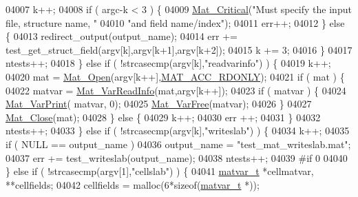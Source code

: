 \begin{DoxyCode}
{{{{{{{{{{{{{{{{{{{{{{{{{{{{{{{{{{{{{{{{{{{{{{{{{{{{{{{{{{{{{{{{{{{{04007             k++;
04008             \textcolor{keywordflow}{if} ( argc-k < 3 ) \{
04009                 \hyperlink{group__mat__util_gaf51f2bfbb5580f575e4dd79757e2b80c}{Mat\_Critical}(\textcolor{stringliteral}{"Must specify the input file, structure name, "}
04010                              \textcolor{stringliteral}{"and field name/index"});
04011                 err++;
04012             \} \textcolor{keywordflow}{else} \{
04013                 redirect\_output(output\_name);
04014                 err += test\_get\_struct\_field(argv[k],argv[k+1],argv[k+2]);
04015                 k += 3;
04016             \}
04017             ntests++;
04018         \} \textcolor{keywordflow}{else} \textcolor{keywordflow}{if} ( !strcasecmp(argv[k],\textcolor{stringliteral}{"readvarinfo"}) ) \{
04019             k++;
04020             mat = \hyperlink{group___m_a_t_gafbfedb5636a99f0ef867520c47f77d18}{Mat\_Open}(argv[k++],\hyperlink{group___m_a_t_ggaa9dcbc70f538af79bd557593ff6b5cdba8dd1457651b27ba9bea6cfba158c037c}{MAT\_ACC\_RDONLY});
04021             \textcolor{keywordflow}{if} ( mat ) \{
04022                 matvar = \hyperlink{group___m_a_t_ga46da2e45ed96d3f1a6ec643757f2b086}{Mat\_VarReadInfo}(mat,argv[k++]);
04023                 \textcolor{keywordflow}{if} ( matvar ) \{
04024                     \hyperlink{group___m_a_t_ga9100c145e338b84b55d5d0795d5d390a}{Mat\_VarPrint}( matvar, 0);
04025                     \hyperlink{group___m_a_t_ga1d14716f7450530fd1c9d02413787f0e}{Mat\_VarFree}(matvar);
04026                 \}
04027                 \hyperlink{group___m_a_t_ga101c92ff7bde4a2d4615661beba09262}{Mat\_Close}(mat);
04028             \} \textcolor{keywordflow}{else} \{
04029                 k++;
04030                 err ++;
04031             \}
04032             ntests++;
04033         \} \textcolor{keywordflow}{else} \textcolor{keywordflow}{if} ( !strcasecmp(argv[k],\textcolor{stringliteral}{"writeslab"}) ) \{
04034            k++;
04035             \textcolor{keywordflow}{if} ( NULL == output\_name )
04036                 output\_name = \textcolor{stringliteral}{"test\_mat\_writeslab.mat"};
04037             err += test\_writeslab(output\_name);
04038             ntests++;
04039 \textcolor{preprocessor}{    #if 0}
04040         \} \textcolor{keywordflow}{else} \textcolor{keywordflow}{if} ( !strcasecmp(argv[1],\textcolor{stringliteral}{"cellslab"}) ) \{
04041             \hyperlink{group___m_a_t_structmatvar__t}{matvar\_t} *cellmatvar, **cellfields;
04042                 cellfields = malloc(6*\textcolor{keyword}{sizeof}(\hyperlink{group___m_a_t_structmatvar__t}{matvar\_t} *));
}}}}}}}}}}}}}}}}}}}}}}}}}}}}}}}}}}}}}}}}}}}}}}}}}}}}}}}}}}}}}}}}}}}}
\end{DoxyCode}
